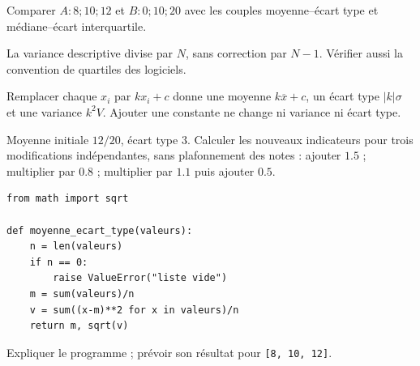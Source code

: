 \begin{example}Comparer $A:8;10;12$ et $B:0;10;20$ avec les couples moyenne--écart type et médiane--écart interquartile.\end{example}
\begin{teachernote}La variance descriptive divise par $N$, sans correction par $N-1$. Vérifier aussi la convention de quartiles des logiciels.\end{teachernote}
\begin{keypoint}[Propriété]
Remplacer chaque $x_i$ par $kx_i+c$ donne une moyenne $k\overline x+c$, un écart type $|k|\sigma$ et une variance $k^2V$. Ajouter une constante ne change ni variance ni écart type.
\end{keypoint}
\begin{example}Moyenne initiale $12/20$, écart type $3$. Calculer les nouveaux indicateurs pour trois modifications indépendantes, sans plafonnement des notes : ajouter $\num{1,5}$ ; multiplier par $\num{0,8}$ ; multiplier par $\num{1,1}$ puis ajouter $\num{0,5}$.\end{example}
\begin{lstlisting}
from math import sqrt

def moyenne_ecart_type(valeurs):
    n = len(valeurs)
    if n == 0:
        raise ValueError("liste vide")
    m = sum(valeurs)/n
    v = sum((x-m)**2 for x in valeurs)/n
    return m, sqrt(v)
\end{lstlisting}
\begin{example}Expliquer le programme ; prévoir son résultat pour \texttt{[8, 10, 12]}.\end{example}
